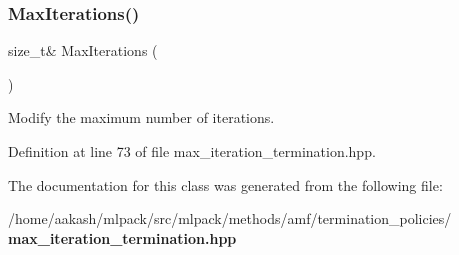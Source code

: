 \subsubsection{Max\+Iterations()\hspace{0.1cm}{\footnotesize\ttfamily [2/2]}}
{\footnotesize\ttfamily size\+\_\+t\& Max\+Iterations (\begin{DoxyParamCaption}{ }\end{DoxyParamCaption})\hspace{0.3cm}{\ttfamily [inline]}}



Modify the maximum number of iterations. 



Definition at line 73 of file max\+\_\+iteration\+\_\+termination.\+hpp.



The documentation for this class was generated from the following file\+:\begin{DoxyCompactItemize}
\item 
/home/aakash/mlpack/src/mlpack/methods/amf/termination\+\_\+policies/\textbf{ max\+\_\+iteration\+\_\+termination.\+hpp}\end{DoxyCompactItemize}
